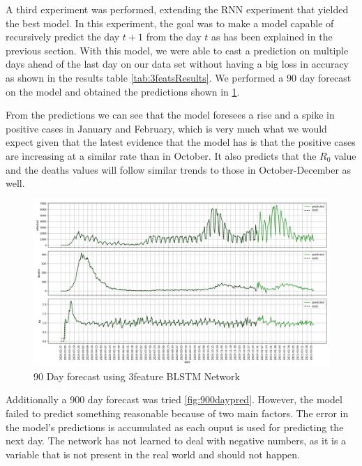 \documentclass[anon]{CI}
\begin{document}
A third experiment was performed, extending the RNN experiment that yielded the best model. In this experiment, the goal was to make a model capable of recursively predict the day $t+1$ from the day $t$ as has been explained in the previous section. With this model, we were able to cast a prediction on multiple days ahead of the last day on our data set without having a big loss in accuracy as shown in the results table \ref{tab:3featsResults}. We performed a 90 day forecast on the model and obtained the predictions shown in \ref{fig:90daypred}.

From the predictions we can see that the model foresees a rise and a spike in positive cases in January and February, which is very much what we would expect given that the latest evidence that the model has is that the positive cases are increasing at a similar rate than in October. It also predicts that the $R_0$ value and the deaths values will follow similar trends to those in October-December as well.

 \begin{figure}[!ht]
     \center
     \includegraphics[width=\linewidth]{blstm3feats-90extension}
     \caption{\label{fig:90daypred}90 Day forecast using 3feature BLSTM Network}
 \end{figure}

Additionally a 900 day forecast was tried \ref{fig:900daypred}. However, the model failed to predict something reasonable because of two main factors. The error in the model's predictions is accumulated as each ouput is used for predicting the next day. The network has not learned to deal with negative numbers, as it is a variable that is not present in the real world and should not happen.
\end{document}
